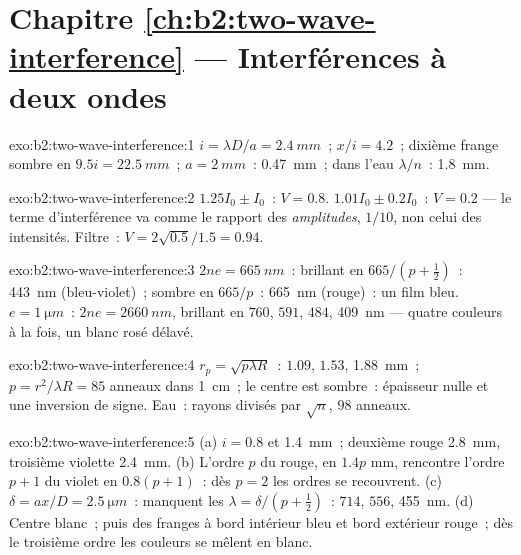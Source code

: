 \section*{Chapitre \ref{ch:b2:two-wave-interference} --- Interférences à deux ondes}

\begin{solution}{exo:b2:two-wave-interference:1}
$i = \lambda D/a = \qty{2.4}{mm}$~; $x/i = 4.2$~; dixième frange sombre en $9.5i = \qty{22.5}{mm}$~;
$a = \qty{2}{mm}$~: \qty{0.47}{mm}~; dans l'eau $\lambda/n$~: \qty{1.8}{mm}.
\end{solution}

\begin{solution}{exo:b2:two-wave-interference:2}
$1.25I_0 \pm I_0$~: $V = 0.8$. $1.01I_0 \pm 0.2I_0$~: $V = 0.2$ --- le terme d'interférence
va comme le rapport des \emph{amplitudes}, $1/10$, non celui des intensités. Filtre~:
$V = 2\sqrt{0.5}/1.5 = 0.94$.
\end{solution}

\begin{solution}{exo:b2:two-wave-interference:3}
$2ne = \qty{665}{nm}$~: brillant en $665/(p + \tfrac12)$~: \qty{443}{nm} (bleu-violet)~;
sombre en $665/p$~: \qty{665}{nm} (rouge)~: un film bleu. $e = \qty{1}{\micro m}$~: $2ne = \qty{2660}{nm}$,
brillant en $760$, $591$, $484$, \qty{409}{nm} --- quatre couleurs à la fois, un
blanc rosé délavé.
\end{solution}

\begin{solution}{exo:b2:two-wave-interference:4}
$r_p = \sqrt{p\lambda R}$~: $1.09$, $1.53$, \qty{1.88}{mm}~; $p = r^2/\lambda R = 85$ anneaux dans
\qty{1}{cm}~; le centre est sombre~: épaisseur nulle et une inversion de signe. Eau~:
rayons divisés par $\sqrt n$, $98$ anneaux.
\end{solution}

\begin{solution}{exo:b2:two-wave-interference:5}
(a) $i = 0.8$ et \qty{1.4}{mm}~; deuxième rouge \qty{2.8}{mm}, troisième violette \qty{2.4}{mm}.
(b) L'ordre $p$ du rouge, en $1.4p$ mm, rencontre l'ordre $p + 1$ du violet en $0.8(p + 1)$~: dès
$p = 2$ les ordres se recouvrent. (c) $\delta = ax/D = \qty{2.5}{\micro m}$~: manquent les $\lambda = \delta/(p +
\tfrac12)$~: $714$, $556$, \qty{455}{nm}. (d) Centre blanc~; puis des franges à
bord intérieur bleu et bord extérieur rouge~; dès le troisième ordre les couleurs
se mêlent en blanc.
\end{solution}

